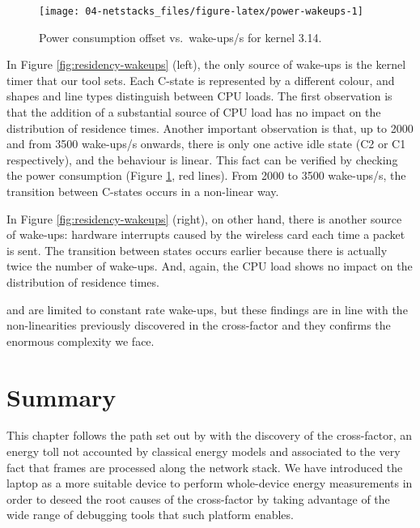 \documentclass[twoside,nohyper]{tufte-book}
\theoremstyle{definition}
\theoremstyle{definition}
\theoremstyle{definition}
\theoremstyle{remark}
\begin{document}
\begin{figure}

{\centering \texttt{[image: 04-netstacks\_files/figure-latex/power-wakeups-1]} 

}

\caption[Power consumption offset vs.~wake-ups/s for kernel
3.14.]{Power consumption offset vs.~wake-ups/s for kernel
3.14.}\label{fig:power-wakeups}
\end{figure}

In Figure \ref{fig:residency-wakeups} (left), the only source of
wake-ups is the kernel timer that our tool sets. Each C-state is
represented by a different colour, and shapes and line types distinguish
between CPU loads. The first observation is that the addition of a
substantial source of CPU load has no impact on the distribution of
residence times. Another important observation is that, up to 2000 and
from 3500 wake-ups/s onwards, there is only one active idle state (C2 or
C1 respectively), and the behaviour is linear. This fact can be verified
by checking the power consumption (Figure \ref{fig:power-wakeups}, red
lines). From 2000 to 3500 wake-ups/s, the transition between C-states
occurs in a non-linear way.

In Figure \ref{fig:residency-wakeups} (right), on other hand, there is
another source of wake-ups: hardware interrupts caused by the wireless
card each time a packet is sent. The transition between states occurs
earlier because there is actually twice the number of wake-ups. And,
again, the CPU load shows no impact on the distribution of residence
times.

 and are limited to constant rate
wake-ups, but these findings are in line with the non-linearities
previously discovered in the cross-factor and they confirms the enormous
complexity we face.

\hypertarget{summary-1}{%
\section{Summary}\label{summary-1}}

This chapter follows the path set out by \citet{Serrano2014} with the
discovery of the cross-factor, an energy toll not accounted by classical
energy models and associated to the very fact that frames are processed
along the network stack. We have introduced the laptop as a more
suitable device to perform whole-device energy measurements in order to
deseed the root causes of the cross-factor by taking advantage of the
wide range of debugging tools that such platform enables.
\end{document}
